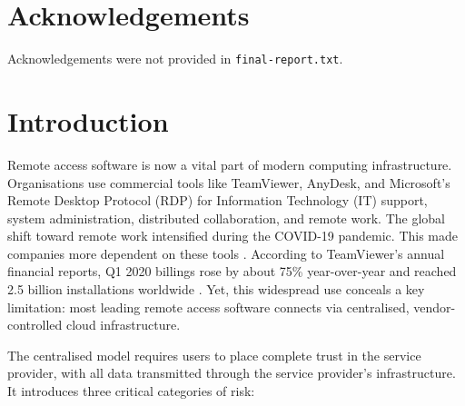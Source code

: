 \documentclass[12pt,a4paper]{article}
\begin{document}
\tableofcontents
\newpage

\listoftables
\newpage

\listoffigures
\newpage

\section*{Acknowledgements}
Acknowledgements were not provided in \texttt{final-report.txt}.
\newpage

\section{Introduction}

Remote access software is now a vital part of modern computing infrastructure. Organisations use commercial tools like TeamViewer, AnyDesk, and Microsoft’s Remote Desktop Protocol (RDP) for Information Technology (IT) support, system administration, distributed collaboration, and remote work. The global shift toward remote work intensified during the COVID-19 pandemic. This made companies more dependent on these tools \cite{blsremote}. According to TeamViewer’s annual financial reports, Q1 2020 billings rose by about 75\% year-over-year \cite{teamviewer2020q1} and reached 2.5 billion installations worldwide \cite{teamviewer2020anniversary}. Yet, this widespread use conceals a key limitation: most leading remote access software connects via centralised, vendor-controlled cloud infrastructure.

The centralised model requires users to place complete trust in the service provider, with all data transmitted through the service provider’s infrastructure. It introduces three critical categories of risk:
\end{document}
